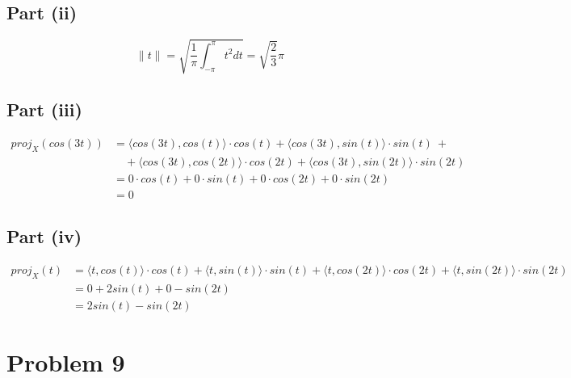 \documentclass{article}
\begin{document}
\subsection*{Part (ii)}

$$\|t\| = \sqrt{\frac{1}{\pi}\int_{-\pi}^\pi t^2 dt} = \sqrt{\frac{2}{3}} \pi$$

\subsection*{Part (iii)}

\begin{align*}
proj_{X}(cos(3t)) &= \langle cos(3t), cos(t) \rangle \cdot cos(t) + \langle cos(3t), sin(t) \rangle \cdot sin(t)\ +\\
			&\quad + \langle cos(3t), cos(2t) \rangle \cdot cos(2t) + \langle cos(3t), sin(2t) \rangle \cdot sin(2t) \\
&= 0 \cdot cos(t) + 0 \cdot sin(t) + 0 \cdot cos(2t) + 0 \cdot sin(2t)\\
&= 0
\end{align*}

\subsection*{Part (iv)}

\begin{align*}
proj_{X}(t) &= \langle t, cos(t) \rangle \cdot cos(t) + \langle t, sin(t) \rangle \cdot sin(t) + \langle t, cos(2t) \rangle \cdot cos(2t) + \langle t, sin(2t) \rangle \cdot sin(2t) \\
&= 0 + 2sin(t) + 0 - sin(2t) \\
&= 2sin(t) - sin(2t)
\end{align*}

\section*{Problem 9}
\end{document}

